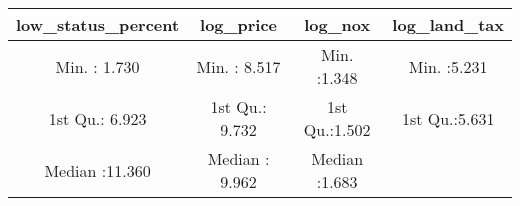 \documentclass[
]{article}
\begin{document}
\begin{longtable}[]{@{}cccc@{}}
\toprule
\begin{minipage}[b]{0.26\columnwidth}\centering
low\_status\_percent\strut
\end{minipage} & \begin{minipage}[b]{0.21\columnwidth}\centering
log\_price\strut
\end{minipage} & \begin{minipage}[b]{0.20\columnwidth}\centering
log\_nox\strut
\end{minipage} & \begin{minipage}[b]{0.20\columnwidth}\centering
log\_land\_tax\strut
\end{minipage}\tabularnewline
\midrule
\endhead
\begin{minipage}[t]{0.26\columnwidth}\centering
Min. : 1.730\strut
\end{minipage} & \begin{minipage}[t]{0.21\columnwidth}\centering
Min. : 8.517\strut
\end{minipage} & \begin{minipage}[t]{0.20\columnwidth}\centering
Min. :1.348\strut
\end{minipage} & \begin{minipage}[t]{0.20\columnwidth}\centering
Min. :5.231\strut
\end{minipage}\tabularnewline
\begin{minipage}[t]{0.26\columnwidth}\centering
1st Qu.: 6.923\strut
\end{minipage} & \begin{minipage}[t]{0.21\columnwidth}\centering
1st Qu.: 9.732\strut
\end{minipage} & \begin{minipage}[t]{0.20\columnwidth}\centering
1st Qu.:1.502\strut
\end{minipage} & \begin{minipage}[t]{0.20\columnwidth}\centering
1st Qu.:5.631\strut
\end{minipage}\tabularnewline
\begin{minipage}[t]{0.26\columnwidth}\centering
Median :11.360\strut
\end{minipage} & \begin{minipage}[t]{0.21\columnwidth}\centering
Median : 9.962\strut
\end{minipage} & \begin{minipage}[t]{0.20\columnwidth}\centering
Median :1.683\strut
\end{minipage} & \begin{minipage}[t]{0.20\columnwidth}\centering

\end{minipage}
\end{longtable}
\end{document}

